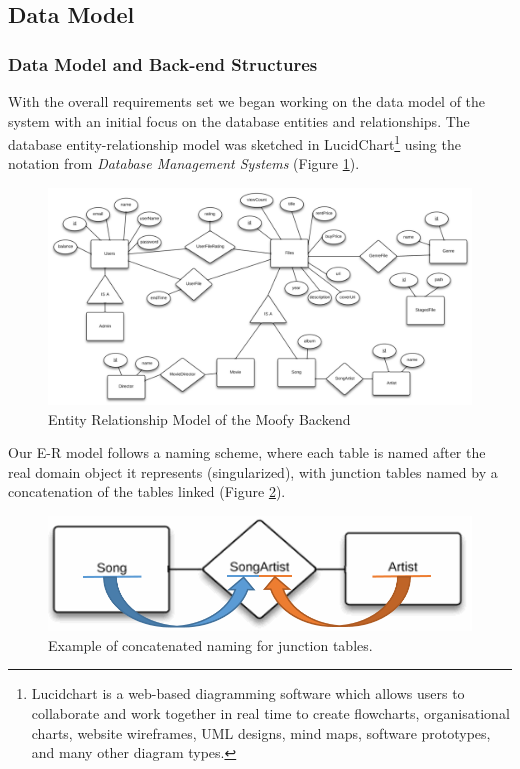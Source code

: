 \subsection{Data Model}
\subsubsection{Data Model and Back-end Structures}
\label{sec:datamodel}

With the overall requirements set we began working on the data model of the system with an initial focus on the database entities and relationships. The database entity-relationship model was sketched in LucidChart\footnote{Lucidchart is a web-based diagramming software which allows users to collaborate and work together in real time to create flowcharts, organisational charts, website wireframes, UML designs, mind maps, software prototypes, and many other diagram types.} using the notation from \emph{Database Management Systems}\cite{dbbook} (Figure \ref{fig:erd}).

\begin{figure}[ht]
	\centering
	\includegraphics[scale=0.5]{./p1design/erdmodel.png}
	\caption{Entity Relationship Model of the Moofy Backend}
	\label{fig:erd}
\end{figure}

Our E-R model follows a naming scheme, where each table is named after the real domain object it represents (singularized), with junction tables named by a concatenation of the tables linked (Figure \ref{fig:junctionfigure}).


\begin{figure}[hbt]
	\centering
	\includegraphics[scale=0.3]{./p1design/junctionfigure.png}
	\caption{Example of concatenated naming for junction tables.}
	\label{fig:junctionfigure}
\end{figure}


